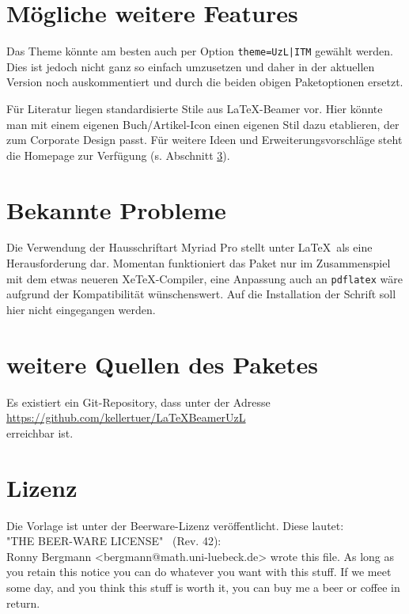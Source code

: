 \documentclass[a4paper,DIV=calc, oneside]{scrartcl}
\begin{document}
\section{Mögliche weitere Features}
Das Theme könnte am besten auch per Option \lstinline!theme=UzL|ITM! gewählt werden. Dies ist jedoch nicht ganz so einfach umzusetzen und daher in der aktuellen Version noch auskommentiert und durch die beiden obigen Paketoptionen ersetzt.

Für Literatur liegen standardisierte Stile aus LaTeX-Beamer vor. Hier könnte man mit einem eigenen Buch/Artikel-Icon einen eigenen Stil dazu etablieren, der zum Corporate Design passt. Für weitere Ideen und Erweiterungsvorschläge steht die Homepage zur Verfügung (s. Abschnitt \ref{sec:HP}).

\section{Bekannte Probleme}
Die Verwendung der Hausschriftart Myriad Pro stellt unter \LaTeX\ als eine Herausforderung dar. Momentan funktioniert das Paket nur im Zusammenspiel mit dem etwas neueren XeTeX-Compiler, eine Anpassung auch an \lstinline!pdflatex! wäre aufgrund der Kompatibilität wünschenswert. Auf die Installation der Schrift soll hier nicht eingegangen werden.
\section{weitere Quellen des Paketes}\label{sec:HP}
Es existiert ein Git-Repository, dass unter der Adresse\\ \href{https://github.com/kellertuer/LaTeXBeamerUzL}{https://github.com/kellertuer/LaTeXBeamerUzL}\\
erreichbar ist.
\section{Lizenz}
Die Vorlage ist unter der Beerware-Lizenz veröffentlicht. Diese lautet:\\[1\baselineskip]
\textrm{"THE BEER-WARE LICENSE" \ (Rev. 42):\\
Ronny Bergmann <bergmann@math.uni-luebeck.de> wrote this file. As long as you retain this notice you
can do whatever you want with this stuff. If we meet some day, and you think 
this stuff is worth it, you can buy me a beer or coffee in return.}
\end{document}
